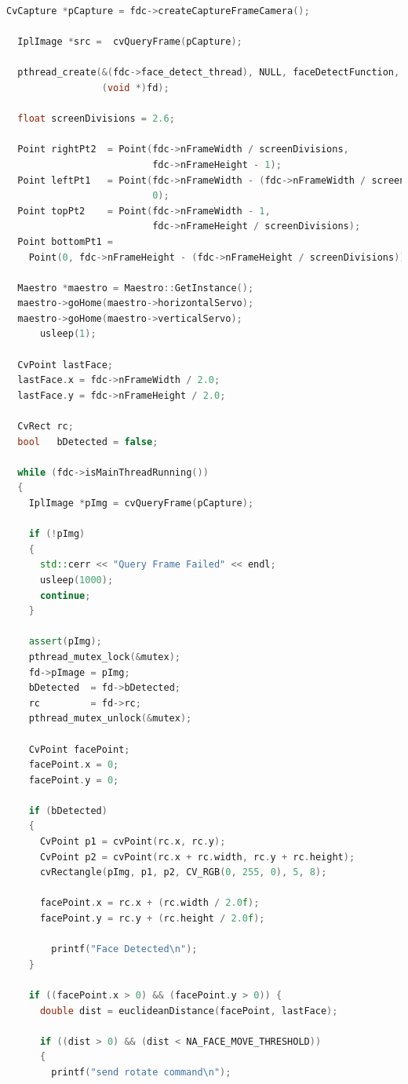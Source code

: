 \documentclass[11pt,a4paper,titlepage]{report}
\begin{document}
\begin{lstlisting}[caption=face-detect.cpp,language=C++]
  CvCapture *pCapture = fdc->createCaptureFrameCamera();

  IplImage *src =  cvQueryFrame(pCapture);

  pthread_create(&(fdc->face_detect_thread), NULL, faceDetectFunction,
                 (void *)fd);

  float screenDivisions = 2.6;

  Point rightPt2  = Point(fdc->nFrameWidth / screenDivisions,
                          fdc->nFrameHeight - 1);
  Point leftPt1   = Point(fdc->nFrameWidth - (fdc->nFrameWidth / screenDivisions),
                          0);
  Point topPt2    = Point(fdc->nFrameWidth - 1,
                          fdc->nFrameHeight / screenDivisions);
  Point bottomPt1 =
    Point(0, fdc->nFrameHeight - (fdc->nFrameHeight / screenDivisions));

  Maestro *maestro = Maestro::GetInstance();
  maestro->goHome(maestro->horizontalServo);
  maestro->goHome(maestro->verticalServo);
      usleep(1);

  CvPoint lastFace;
  lastFace.x = fdc->nFrameWidth / 2.0;
  lastFace.y = fdc->nFrameHeight / 2.0;

  CvRect rc;
  bool   bDetected = false;

  while (fdc->isMainThreadRunning())
  {
    IplImage *pImg = cvQueryFrame(pCapture);

    if (!pImg)
    {
      std::cerr << "Query Frame Failed" << endl;
      usleep(1000);
      continue;
    }

    assert(pImg);
    pthread_mutex_lock(&mutex);
    fd->pImage = pImg;
    bDetected  = fd->bDetected;
    rc         = fd->rc;
    pthread_mutex_unlock(&mutex);

    CvPoint facePoint;
    facePoint.x = 0;
    facePoint.y = 0;

    if (bDetected)
    {
      CvPoint p1 = cvPoint(rc.x, rc.y);
      CvPoint p2 = cvPoint(rc.x + rc.width, rc.y + rc.height);
      cvRectangle(pImg, p1, p2, CV_RGB(0, 255, 0), 5, 8);

      facePoint.x = rc.x + (rc.width / 2.0f);
      facePoint.y = rc.y + (rc.height / 2.0f);

        printf("Face Detected\n");
    }

    if ((facePoint.x > 0) && (facePoint.y > 0)) {
      double dist = euclideanDistance(facePoint, lastFace);

      if ((dist > 0) && (dist < NA_FACE_MOVE_THRESHOLD))
      {
        printf("send rotate command\n");


\end{lstlisting}
\end{document}
